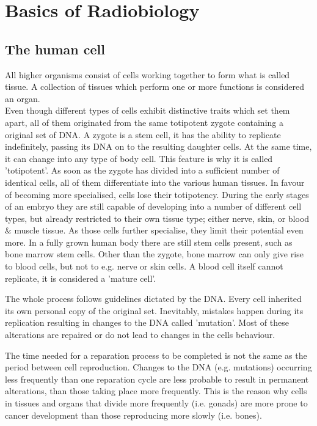\section{Basics of Radiobiology}
\label{sec:cell}
\subsection{The human cell}
All higher organisms consist of cells working together to form what is called tissue.
A collection of tissues which perform one or more functions is considered an organ. \\

Even though different types of cells exhibit distinctive traits which set them apart, all of them originated from the same totipotent zygote containing a original set of DNA.
A zygote is a stem cell, it has the ability to replicate indefinitely, passing its DNA on to the resulting daughter cells.
At the same time, it can change into any type of body cell. This feature is why it is called 'totipotent'.
As soon as the zygote has divided into a sufficient number of identical cells, all of them differentiate into the various human tissues.
In favour of becoming more specialised, cells lose their totipotency.
During the early stages of an embryo they are still capable of developing into a number of different cell types, but already restricted to their own tissue type; either nerve, skin, or blood \& muscle tissue.
As those cells further specialise, they limit their potential even more.
In a fully grown human body there are still stem cells present, such as bone marrow stem cells.
Other than the zygote, bone marrow can only give rise to blood cells, but not to e.g. nerve or skin cells.
A blood cell itself cannot replicate, it is considered a 'mature cell'.

The whole process follows guidelines dictated by the DNA.
Every cell inherited its own personal copy of the original set.
Inevitably, mistakes happen during its replication resulting in changes to the DNA called 'mutation'.
Most of these alterations are repaired or do not lead to changes in the cells behaviour.

The time needed for a reparation process to be completed is not the same as the period between cell reproduction. Changes to the DNA (e.g. mutations) occurring less frequently than one reparation cycle are less probable to result in permanent alterations, than those taking place more frequently. This is the reason why cells in tissues and organs that divide more frequently (i.e. gonads) are more prone to cancer development than those reproducing more slowly (i.e. bones).

